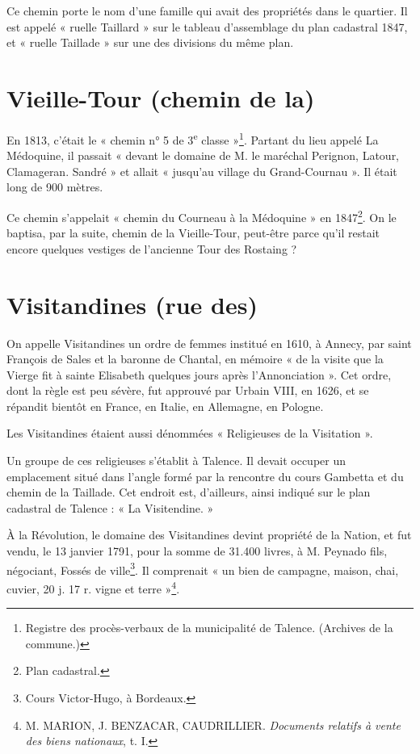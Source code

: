 \documentclass[a4paper,11pt]{book}
\begin{document}
Ce chemin porte le nom d'une famille qui avait des propriétés dans le quartier. Il est appelé « ruelle Taillard » sur le tableau d'assemblage du plan cadastral 1847, et « ruelle Taillade » sur une des divisions du même plan.

\section{Vieille-Tour (chemin de la)}

En 1813, c'était le « chemin n° 5 de 3\textsuperscript{e} classe »\footnote{Registre des procès-verbaux de la municipalité de Talence. (Archives de la commune.)}. Partant du lieu appelé La Médoquine, il passait « devant le domaine de M. le maréchal Perignon, Latour, Clamageran. Sandré » et allait « jusqu'au village du Grand-Cournau ». Il était long de 900 mètres.

Ce chemin s'appelait « chemin du Courneau à la Médoquine » en 1847\footnote{Plan cadastral.}. On le baptisa, par la suite, chemin de la Vieille-Tour, peut-être parce qu'il restait encore quelques vestiges de l'ancienne Tour des Rostaing ?

\section{Visitandines (rue des)}

On appelle Visitandines un ordre de femmes institué en 1610, à Annecy, par saint François de Sales et la baronne de Chantal, en mémoire « de la visite que la Vierge fit à sainte Elisabeth quelques jours après l'Annonciation ». Cet ordre, dont la règle est peu sévère, fut approuvé par Urbain VIII, en 1626, et se répandit bientôt en France, en Italie, en Allemagne, en Pologne.

Les Visitandines étaient aussi dénommées « Religieuses de la Visitation ».

Un groupe de ces religieuses s'établit à Talence. Il devait occuper un emplacement situé dans l'angle formé par la rencontre du cours Gambetta et du chemin de la Taillade. Cet endroit est, d'ailleurs, ainsi indiqué sur le plan cadastral de Talence : « La Visitendine. »

À la Révolution, le domaine des Visitandines devint propriété de la Nation, et fut vendu, le 13 janvier 1791, pour la somme de 31.400 livres, à M. Peynado fils, négociant, Fossés de ville\footnote{Cours Victor-Hugo, à Bordeaux.}. Il comprenait « un bien de campagne, maison, chai, cuvier, 20 j. 17 r. vigne et terre »\footnote{M. \textsc{MARION}, J. \textsc{BENZACAR}, \textsc{CAUDRILLIER}. \textit{Documents relatifs à vente des biens nationaux}, t. I.}.
\end{document}

